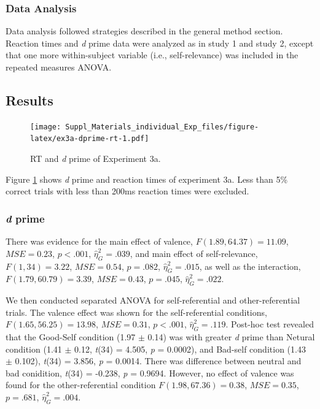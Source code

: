 \documentclass[
  english,
  man]{apa6}
\begin{document}
\hypertarget{data-analysis-3}{%
\subsubsection{Data Analysis}\label{data-analysis-3}}

Data analysis followed strategies described in the general method section. Reaction times and \emph{d} prime data were analyzed as in study 1 and study 2, except that one more within-subject variable (i.e., self-relevance) was included in the repeated measures ANOVA.

\hypertarget{results-4}{%
\subsection{Results}\label{results-4}}

\begin{figure}
\centering
\texttt{[image: Suppl\_Materials\_individual\_Exp\_files/figure-latex/ex3a-dprime-rt-1.pdf]}
\caption{\label{fig:ex3a-dprime-rt}RT and \emph{d} prime of Experiment 3a.}
\end{figure}

Figure \ref{fig:ex3a-dprime-rt} shows \emph{d} prime and reaction times of experiment 3a. Less than 5\% correct trials with less than 200ms reaction times were excluded.

\hypertarget{d-prime-3}{%
\subsubsection{\texorpdfstring{\emph{d} prime}{d prime}}\label{d-prime-3}}

There was evidence for the main effect of valence, \(F(1.89, 64.37) = 11.09\), \(\mathit{MSE} = 0.23\), \(p < .001\), \(\hat{\eta}^2_G = .039\), and main effect of self-relevance, \(F(1, 34) = 3.22\), \(\mathit{MSE} = 0.54\), \(p = .082\), \(\hat{\eta}^2_G = .015\), as well as the interaction, \(F(1.79, 60.79) = 3.39\), \(\mathit{MSE} = 0.43\), \(p = .045\), \(\hat{\eta}^2_G = .022\).

We then conducted separated ANOVA for self-referential and other-referential trials. The valence effect was shown for the self-referential conditions, \(F(1.65, 56.25) = 13.98\), \(\mathit{MSE} = 0.31\), \(p < .001\), \(\hat{\eta}^2_G = .119\). Post-hoc test revealed that the Good-Self condition (1.97 \(\pm\) 0.14) was with greater \emph{d} prime than Netural condition (1.41 \(\pm\) 0.12, \emph{t}(34) = 4.505, \emph{p} = 0.0002), and Bad-self condition (1.43 \(\pm\) 0.102), \emph{t}(34) = 3.856, \emph{p} = 0.0014. There was difference between neutral and bad conidition, \emph{t}(34) = -0.238, \emph{p} = 0.9694. However, no effect of valence was found for the other-referential condition \(F(1.98, 67.36) = 0.38\), \(\mathit{MSE} = 0.35\), \(p = .681\), \(\hat{\eta}^2_G = .004\).
\end{document}
